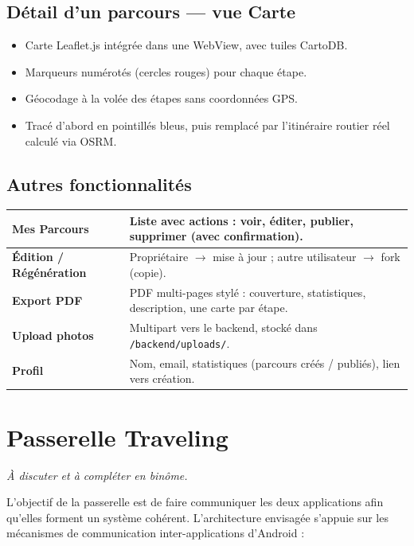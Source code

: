 \documentclass[11pt,a4paper]{article}
\begin{document}
\subsection{Détail d'un parcours --- vue Carte}

\begin{itemize}
  \item Carte Leaflet.js intégrée dans une WebView, avec tuiles CartoDB.
  \item Marqueurs numérotés (cercles rouges) pour chaque étape.
  \item Géocodage à la volée des étapes sans coordonnées GPS.
  \item Tracé d'abord en pointillés bleus, puis remplacé par l'itinéraire routier
    réel calculé via OSRM.
\end{itemize}

\subsection{Autres fonctionnalités}

\begin{tabularx}{\linewidth}{@{}>{\bfseries}lX@{}}
\toprule
Mes Parcours & Liste avec actions : voir, éditer, publier, supprimer (avec confirmation). \\
\midrule
Édition / Régénération & Propriétaire $\rightarrow$ mise à jour ; autre utilisateur
  $\rightarrow$ fork (copie). \\
\midrule
Export PDF & PDF multi-pages stylé : couverture, statistiques, description, une carte
  par étape. \\
\midrule
Upload photos & Multipart vers le backend, stocké dans \texttt{/backend/uploads/}. \\
\midrule
Profil & Nom, email, statistiques (parcours créés / publiés), lien vers création. \\
\bottomrule
\end{tabularx}

\vspace{1em}




\section{Passerelle Traveling}

\textit{À discuter et à compléter en binôme.}

L'objectif de la passerelle est de faire communiquer les deux applications afin
qu'elles forment un système cohérent. L'architecture envisagée s'appuie sur les
mécanismes de communication inter-applications d'Android :
\end{document}
